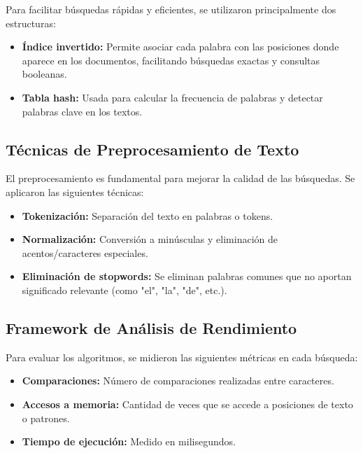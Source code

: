 \documentclass[9pt,letterpaper,onecolumn]{rho-class/rho}
\begin{document}
Para facilitar búsquedas rápidas y eficientes, se utilizaron principalmente dos estructuras:

\begin{itemize}
    \item \textbf{Índice invertido:} Permite asociar cada palabra con las posiciones donde aparece en los documentos, facilitando búsquedas exactas y consultas booleanas.
    \item \textbf{Tabla hash:} Usada para calcular la frecuencia de palabras y detectar palabras clave en los textos.
\end{itemize}


\subsection{Técnicas de Preprocesamiento de Texto}

El preprocesamiento es fundamental para mejorar la calidad de las búsquedas. Se aplicaron las siguientes técnicas:

\begin{itemize}
    \item \textbf{Tokenización:} Separación del texto en palabras o tokens.
    \item \textbf{Normalización:} Conversión a minúsculas y eliminación de acentos/caracteres especiales.
    \item \textbf{Eliminación de stopwords:} Se eliminan palabras comunes que no aportan significado relevante (como "el", "la", "de", etc.).
\end{itemize}


\subsection{Framework de Análisis de Rendimiento}

Para evaluar los algoritmos, se midieron las siguientes métricas en cada búsqueda:

\begin{itemize}
    \item \textbf{Comparaciones:} Número de comparaciones realizadas entre caracteres.
    \item \textbf{Accesos a memoria:} Cantidad de veces que se accede a posiciones de texto o patrones.
    \item \textbf{Tiempo de ejecución:} Medido en milisegundos.
\end{itemize}
\end{document}
